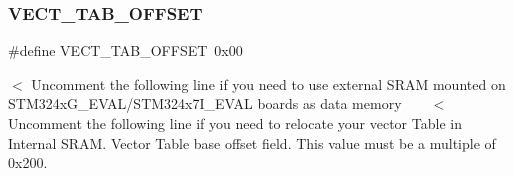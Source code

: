 \subsubsection{\texorpdfstring{V\+E\+C\+T\+\_\+\+T\+A\+B\+\_\+\+O\+F\+F\+S\+ET}{VECT\_TAB\_OFFSET}}
{\footnotesize\ttfamily \#define V\+E\+C\+T\+\_\+\+T\+A\+B\+\_\+\+O\+F\+F\+S\+ET~0x00}

$<$ Uncomment the following line if you need to use external S\+R\+AM mounted on S\+T\+M324x\+G\+\_\+\+E\+V\+A\+L/\+S\+T\+M324x7\+I\+\_\+\+E\+V\+AL boards as data memory ~\newline
~\newline
 $<$ Uncomment the following line if you need to relocate your vector Table in Internal S\+R\+AM. Vector Table base offset field. This value must be a multiple of 0x200. 